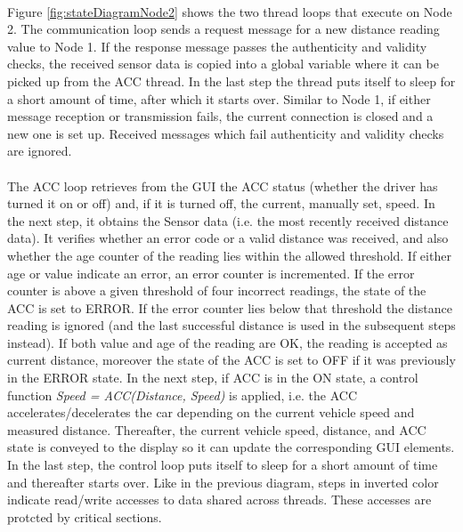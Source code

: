 \paragraph{}
Figure \ref{fig:stateDiagramNode2} shows the two thread loops that execute on Node 2. The communication loop sends a request message for a new distance reading value to Node 1. If the response message passes the authenticity and validity checks, the received sensor data is copied into a global variable where it can be picked up from the ACC thread. In the last step the thread puts itself to sleep for a short amount of time, after which it starts over. Similar to Node 1, if either message reception or transmission fails, the current connection is closed and a new one is set up. Received messages which fail authenticity and validity checks are ignored.

\paragraph{}
The ACC loop retrieves from the GUI the ACC status (whether the driver has turned it on or off) and, if it is turned off, the current, manually set, speed. In the next step, it obtains the Sensor data (i.e. the most recently received distance data). It verifies whether an error code or a valid distance was received, and also whether the age counter of the reading lies within the allowed threshold. If either age or value indicate an error, an error counter is incremented. If the error counter is above a given threshold of four incorrect readings, the state of the ACC is set to ERROR. If the error counter lies below that threshold the distance reading is ignored (and the last successful distance is used in the subsequent steps instead). If both value and age of the reading are OK, the reading is accepted as current distance, moreover the state of the ACC is set to OFF if it was previously in the ERROR state.
In the next step, if ACC is in the ON state, a control function \emph{Speed = ACC(Distance, Speed)} is applied, i.e. the ACC accelerates/decelerates the car depending on the current vehicle speed and measured distance.
Thereafter, the current vehicle speed, distance, and ACC state is conveyed to the display so it can update the corresponding GUI elements. In the last step, the control loop puts itself to sleep for a short amount of time and thereafter starts over. Like in the previous diagram, steps in inverted color indicate read/write accesses to data shared across threads. These accesses are protcted by critical sections.

